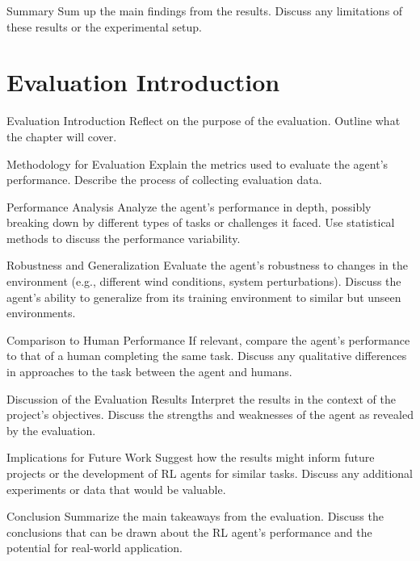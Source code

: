 Summary
Sum up the main findings from the results.
Discuss any limitations of these results or the experimental setup.


\section{Evaluation Introduction}
Evaluation
Introduction
Reflect on the purpose of the evaluation.
Outline what the chapter will cover.

Methodology for Evaluation
Explain the metrics used to evaluate the agent’s performance.
Describe the process of collecting evaluation data.

Performance Analysis
Analyze the agent’s performance in depth, possibly breaking down by different types of tasks or challenges it faced.
Use statistical methods to discuss the performance variability.

Robustness and Generalization
Evaluate the agent's robustness to changes in the environment (e.g., different wind conditions, system perturbations).
Discuss the agent's ability to generalize from its training environment to similar but unseen environments.

Comparison to Human Performance
If relevant, compare the agent’s performance to that of a human completing the same task.
Discuss any qualitative differences in approaches to the task between the agent and humans.

Discussion of the Evaluation Results
Interpret the results in the context of the project's objectives.
Discuss the strengths and weaknesses of the agent as revealed by the evaluation.

Implications for Future Work
Suggest how the results might inform future projects or the development of RL agents for similar tasks.
Discuss any additional experiments or data that would be valuable.

Conclusion
Summarize the main takeaways from the evaluation.
Discuss the conclusions that can be drawn about the RL agent's performance and the potential for real-world application.